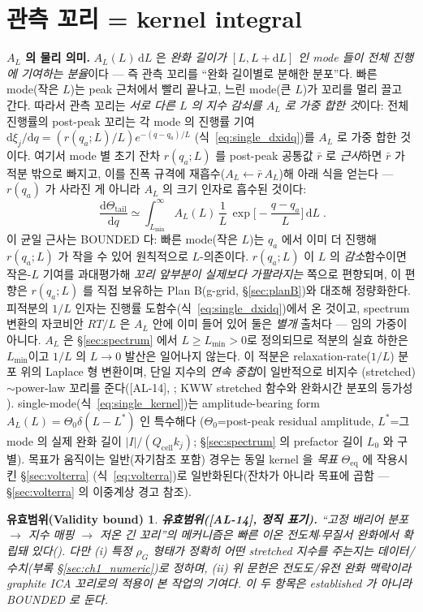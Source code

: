 \documentclass[11pt,a4paper]{article}
\newtheorem*{boundbox}{유효범위(Validity bound)}
\newcommand{\dd}{\mathrm{d}}
\newcommand{\eq}{\mathrm{eq}}
\newcommand{\cell}{\mathrm{cell}}
\newcommand{\AL}[1]{\textsf{[AL-#1]}}
\begin{document}
\section{관측 꼬리 = kernel integral}\label{sec:kernel}
\textbf{$A_L$ 의 물리 의미.} $A_L(L)\,\dd L$ 은 \emph{완화 길이가 $[L,L+\dd L]$ 인 mode 들이 전체 진행에 기여하는
분율}이다 — 즉 관측 꼬리를 ``완화 길이별로 분해한 분포''다. 빠른 mode(작은 $L$)는 peak 근처에서 빨리 끝나고,
느린 mode(큰 $L$)가 꼬리를 멀리 끌고 간다. 따라서 관측 꼬리는 \emph{서로 다른 $L$ 의 지수 감쇠를 $A_L$ 로 가중
합한 것}이다: 전체 진행률의 post-peak 꼬리는 각 mode 의 진행률 기여 $\dd\xi_j/\dd q=(r(q_a;L)/L)e^{-(q-q_a)/L}$
(식~\eqref{eq:single_dxidq})를 $A_L$ 로 가중 합한 것이다. 여기서 mode 별 초기 잔차 $r(q_a;L)$ 를 post-peak
공통값 $\bar r$ 로 \emph{근사}하면 $\bar r$ 가 적분 밖으로 빠지고, 이를 진폭 규격에 재흡수($A_L\!\leftarrow\!\bar r\,A_L$)해
아래 식을 얻는다 — $r(q_a)$ 가 사라진 게 아니라 $A_L$ 의 크기 인자로 흡수된 것이다:
\begin{equation}
\boxed{\;\frac{\dd\Theta_\mathrm{tail}}{\dd q}\simeq\int_{L_{\min}}^\infty A_L(L)\,\frac1L\,
\exp\!\Big[-\frac{q-q_a}{L}\Big]\,\dd L\;.}
\label{eq:kernel_integral}
\end{equation}
이 균일 근사는 BOUNDED 다: 빠른 mode(작은 $L$)는 $q_a$ 에서 이미 더 진행해 $r(q_a;L)$ 가 작을 수 있어 원칙적으로
$L$-의존이다. $r(q_a;L)$ 이 $L$ 의 \emph{감소}함수이면 작은-$L$ 기여를 과대평가해 \emph{꼬리 앞부분이 실제보다
가팔라지는} 쪽으로 편향되며, 이 편향은 $r(q_a;L)$ 를 직접 보유하는 Plan B(g-grid, \S\ref{sec:planB})와 대조해
정량화한다. 피적분의 $1/L$ 인자는 진행률 도함수(식~\eqref{eq:single_dxidq})에서 온 것이고, spectrum 변환의
자코비안 $RT/L$ 은 $A_L$ 안에 이미 들어 있어 둘은 \emph{별개} 출처다 — 임의 가중이 아니다. $A_L$ 은 \S\ref{sec:spectrum}
에서 $L\ge L_{\min}>0$로 정의되므로 적분의 실효 하한은 $L_{\min}$이고 $1/L$ 의 $L\!\to\!0$ 발산은 일어나지 않는다.
이 적분은 relaxation-rate($1/L$) 분포 위의 Laplace 형 변환이며, 단일 지수의 \emph{연속 중첩}이 일반적으로 비지수
(stretched)$\sim$power-law 꼬리를 준다(\AL{14}, \cite{johnston2006}; KWW stretched 함수와 완화시간 분포의
등가성 \cite{lindsey1980}). single-mode(식~\eqref{eq:single_kernel})는 amplitude-bearing form $A_L(L)=\Theta_0\delta(L-L^\ast)$ 인 특수해다
($\Theta_0$=post-peak residual amplitude, $L^\ast$=그 mode 의 실제 완화 길이 $|I|/(Q_\cell k_j)$; \S\ref{sec:spectrum} 의 prefactor 길이 $L_0$ 와 구별).
목표가 움직이는 일반(자기참조 포함) 경우는 동일 kernel 을 \emph{목표} $\Theta_\eq$ 에 작용시킨 \S\ref{sec:volterra}
(식~\eqref{eq:volterra})로 일반화된다(잔차가 아니라 목표에 곱함 — \S\ref{sec:volterra} 의 이중계상 경고 참조).
\begin{boundbox}
\textbf{유효범위(\AL{14}, 정직 표기).} ``고정 배리어 분포 $\to$ 지수 매핑 $\to$ 저온 긴 꼬리''의 메커니즘은
빠른 이온 전도체$\cdot$무질서 완화에서 확립돼 있다(\cite{svare2000,johnston2006,lindsey1980}). 다만 (i)
특정 $\rho_G$ 형태가 \emph{정확히 어떤} stretched 지수를 주는지는 데이터/수치(부록 \S\ref{sec:ch1_numeric})로 정하며, (ii) 위
문헌은 전도도/유전 완화 맥락이라 graphite ICA 꼬리로의 \emph{적용}이 본 작업의 기여다. 이 두 항목은
established 가 아니라 BOUNDED 로 둔다.
\end{boundbox}
\end{document}
